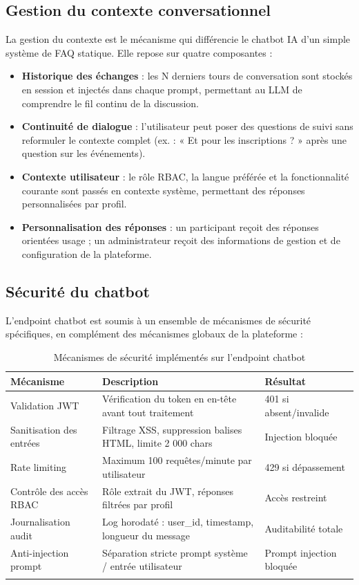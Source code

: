 \subsection{Gestion du contexte conversationnel}
La gestion du contexte est le mécanisme qui différencie le chatbot IA d'un simple système de FAQ statique. Elle repose sur quatre composantes :
\begin{itemize}
    \item \textbf{Historique des échanges} : les N derniers tours de conversation sont stockés en session et injectés dans chaque prompt, permettant au LLM de comprendre le fil continu de la discussion.
    \item \textbf{Continuité de dialogue} : l'utilisateur peut poser des questions de suivi sans reformuler le contexte complet (ex. : « Et pour les inscriptions ? » après une question sur les événements).
    \item \textbf{Contexte utilisateur} : le rôle RBAC, la langue préférée et la fonctionnalité courante sont passés en contexte système, permettant des réponses personnalisées par profil.
    \item \textbf{Personnalisation des réponses} : un participant reçoit des réponses orientées usage ; un administrateur reçoit des informations de gestion et de configuration de la plateforme.
\end{itemize}

\subsection{Sécurité du chatbot}
L'endpoint chatbot est soumis à un ensemble de mécanismes de sécurité spécifiques, en complément des mécanismes globaux de la plateforme :

\begin{longtable}{|m{3.5cm}|m{6cm}|m{3cm}|}
\hline
\textbf{Mécanisme} & \textbf{Description} & \textbf{Résultat} \\
\hline
\endhead
\endfoot
\endlastfoot
\hline
Validation JWT & Vérification du token en en-tête avant tout traitement & 401 si absent/invalide \\
\hline
Sanitisation des entrées & Filtrage XSS, suppression balises HTML, limite 2 000 chars & Injection bloquée \\
\hline
Rate limiting & Maximum 100 requêtes/minute par utilisateur & 429 si dépassement \\
\hline
Contrôle des accès RBAC & Rôle extrait du JWT, réponses filtrées par profil & Accès restreint \\
\hline
Journalisation audit & Log horodaté : user\_id, timestamp, longueur du message & Auditabilité totale \\
\hline
Anti-injection prompt & Séparation stricte prompt système / entrée utilisateur & Prompt injection bloquée \\
\hline
\captionsetup{justification=centering,margin=2cm}
\caption{Mécanismes de sécurité implémentés sur l'endpoint chatbot}
\label{tab:chatbot_security}
\end{longtable}

